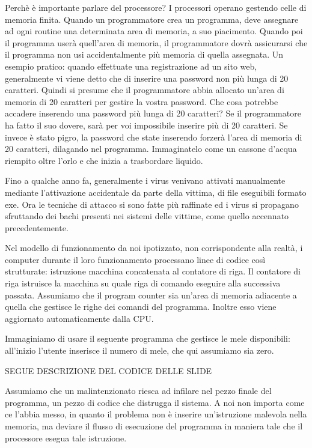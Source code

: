\documentclass[italian,a4paper,12pt,oneside]{report}
\begin{document}
Perchè è importante parlare del processore? 
I processori operano gestendo celle
di memoria finita. Quando un programmatore crea un programma, deve assegnare ad
ogni routine una determinata area di memoria, a suo piacimento.
Quando poi il programma userà quell'area di memoria, il programmatore dovrà
assicurarsi che il programma non usi accidentalmente più memoria di quella
assegnata. Un esempio pratico: quando effettuate una registrazione ad un
sito web, generalmente vi viene detto che di inserire una password non più
lunga di 20 caratteri. Quindi si presume che il programmatore abbia allocato
un'area di memoria di 20 caratteri per gestire la vostra password. Che cosa
potrebbe accadere inserendo una password più lunga di 20 caratteri?
Se il programmatore ha fatto il suo dovere, sarà per voi impossibile inserire
più di 20 caratteri. Se invece è stato pigro, la password che state inserendo
forzerà l'area di memoria di 20 caratteri, dilagando nel programma. Immaginatelo
come un cassone d'acqua riempito oltre l'orlo e che inizia a trasbordare liquido.

Fino a qualche anno fa, generalmente i virus venivano attivati manualmente
mediante l'attivazione accidentale da parte della vittima, di file eseguibili
formato exe. Ora le tecniche di attacco si sono fatte più raffinate ed i virus
si propagano sfruttando dei bachi presenti nei sistemi delle vittime, come
quello accennato precedentemente.


Nel modello di funzionamento da noi ipotizzato, non corrispondente alla realtà,
i computer durante il loro funzionamento processano linee di codice così
strutturate: istruzione macchina concatenata al contatore di riga.
Il contatore di riga istruisce la macchina su quale riga di comando eseguire
alla successiva passata. Assumiamo che il program counter sia un'area di memoria
adiacente a quella che gestisce le righe dei comandi del programma. Inoltre
esso viene aggiornato automaticamente dalla CPU.

Immaginiamo di usare il seguente programma che gestisce le mele disponibili:
all'inizio l'utente inserisce il numero di mele, che qui assumiamo sia zero.

SEGUE DESCRIZIONE DEL CODICE DELLE SLIDE

Assumiamo che un malintenzionato riesca ad infilare nel pezzo finale del
programma, un pezzo di codice che distrugga il sistema. A noi non importa
come ce l'abbia messo, in quanto il problema non è inserire un'istruzione malevola
nella memoria, ma deviare il flusso di esecuzione del programma in maniera tale che
il processore esegua tale istruzione.
\end{document}
